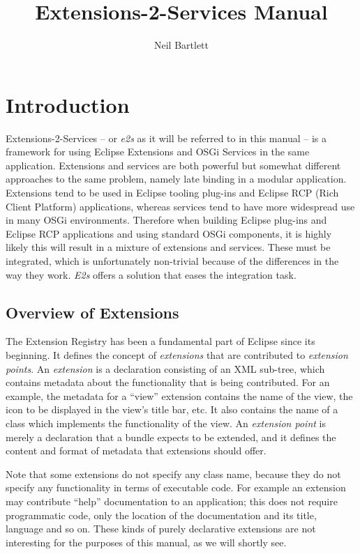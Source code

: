\documentclass[12pt]{article}
\title{Extensions-2-Services Manual}
\author{Neil Bartlett}
\begin{document}
\maketitle
\tableofcontents

\section{Introduction}

Extensions-2-Services -- or \emph{e2s} as it will be referred to in this manual -- is a framework for using Eclipse Extensions and OSGi Services in the same application. Extensions and services are both powerful but somewhat different approaches to the same problem, namely late binding in a modular application. Extensions tend to be used in Eclipse tooling plug-ins and Eclipse RCP (Rich Client Platform) applications, whereas services tend to have more widespread use in many OSGi environments.
Therefore when building Eclipse plug-ins and Eclipse RCP applications and using standard OSGi components, it is highly likely this will result in a mixture of extensions and services. These must be integrated, which is unfortunately non-trivial because of the differences in the way they work. \emph{E2s} offers a solution that eases the integration task.

\subsection{Overview of Extensions}

The Extension Registry has been a fundamental part of Eclipse since its beginning. It defines the concept of \emph{extensions} that are contributed to \emph{extension points}. An \emph{extension} is a declaration consisting of an XML sub-tree, which contains metadata about the functionality that is being contributed. For an example, the metadata for a ``view'' extension contains the name of the view, the icon to be displayed in the view's title bar, etc. It also contains the name of a class which implements the functionality of the view. An \emph{extension point} is merely a declaration that a bundle expects to be extended, and it defines the content and format of metadata that extensions should offer.

Note that some extensions do not specify any class name, because they do not specify any functionality in terms of executable code. For example an extension may contribute ``help'' documentation to an application; this does not require programmatic code, only the location of the documentation and its title, language and so on. These kinds of purely declarative extensions are not interesting for the purposes of this manual, as we will shortly see.
\end{document}
